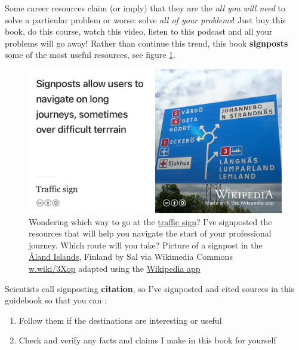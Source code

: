\documentclass[
]{book}
\providecommand{\tightlist}{%
  \setlength{\itemsep}{0pt}\setlength{\parskip}{0pt}}
\begin{document}
Some career resources claim (or imply) that they are the \emph{all you will need} to solve a particular problem or worse: solve \emph{all of your problems}! Just buy this book, do this course, watch this video, listen to this podcast and all your problems will go away! Rather than continue this trend, this book \textbf{signposts} some of the most useful resources, see figure \ref{fig:signposting-fig}.

\begin{figure}

{\centering \includegraphics[width=1\linewidth]{images/signposting} 

}

\caption{Wondering which way to go at the \href{https://en.wikipedia.org/wiki/Traffic_sign}{traffic sign}? I've signposted the resources that will help you navigate the start of your professional journey. Which route will you take? Picture of a signpost in the \href{https://en.wikipedia.org/wiki/\%C3\%85land_Islands}{Åland Islands}, Finland by Sal via Wikimedia Commons \href{https://w.wiki/3Xop}{w.wiki/3Xop} adapted using the \href{https://apps.apple.com/us/app/wikipedia/id324715238}{Wikipedia app}}\label{fig:signposting-fig}
\end{figure}



Scientists call signposting \textbf{citation}, so I've signposted and cited sources in this guidebook so that you can :

\begin{enumerate}
\def\labelenumi{\arabic{enumi}.}
\tightlist
\item
  Follow them if the destinations are interesting or useful
\item
  Check and verify any facts and claims I make in this book for yourself
\end{enumerate}
\end{document}
